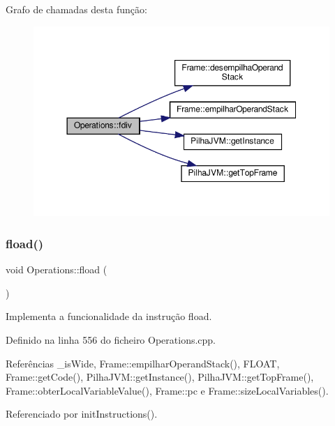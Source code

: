 Grafo de chamadas desta função\+:\nopagebreak
\begin{figure}[H]
\begin{center}
\leavevmode
\includegraphics[width=350pt]{classOperations_a85d79532189d640a6d02c99f204d2229_cgraph}
\end{center}
\end{figure}
\mbox{\label{classOperations_af6204248b38b7e6af3a4a6d0f805d79f}} 
\subsubsection{\texorpdfstring{fload()}{fload()}}
{\footnotesize\ttfamily void Operations\+::fload (\begin{DoxyParamCaption}{ }\end{DoxyParamCaption})\hspace{0.3cm}{\ttfamily [private]}}



Implementa a funcionalidade da instrução fload. 



Definido na linha 556 do ficheiro Operations.\+cpp.



Referências \+\_\+is\+Wide, Frame\+::empilhar\+Operand\+Stack(), F\+L\+O\+AT, Frame\+::get\+Code(), Pilha\+J\+V\+M\+::get\+Instance(), Pilha\+J\+V\+M\+::get\+Top\+Frame(), Frame\+::obter\+Local\+Variable\+Value(), Frame\+::pc e Frame\+::size\+Local\+Variables().



Referenciado por init\+Instructions().

